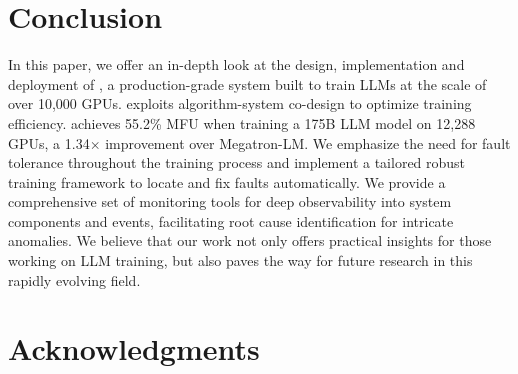 \section{Conclusion}
\label{sec:conclusion}

In this paper, we offer an in-depth look at the design, implementation and
deployment of \sysname, a production-grade system built to train LLMs at the scale of over 10,000 GPUs. \sysname exploits algorithm-system co-design to optimize training efficiency.
\sysname achieves 55.2\% MFU when training a 175B LLM model on 12,288 GPUs, a 1.34$\times$ improvement over Megatron-LM.
We emphasize the
need for fault tolerance throughout the training process and implement a
tailored robust training framework to locate and fix faults automatically. We
provide a comprehensive set of monitoring tools for deep observability into system
components and events, facilitating root cause identification for intricate
anomalies. We believe that our work not only offers practical insights for those
working on LLM training, but also paves the way for future research in this
rapidly evolving field.


\section*{Acknowledgments}

